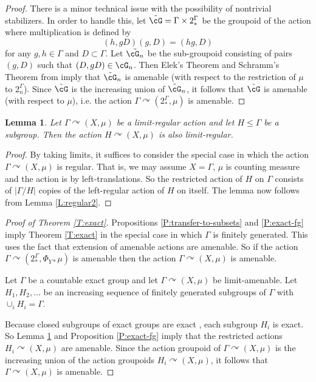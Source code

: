 \documentclass[12pt]{article}
\theoremstyle{plain}
\newtheorem{lem}[thm]{Lemma}
\theoremstyle{definition}
\theoremstyle{remark}
\newcommand{\G}{\Gamma}
\def\cc{{\curvearrowright}}
\begin{document}
\begin{proof}
There is a minor technical issue with the possibility of nontrivial stabilizers. In order to handle this, let $\tilde{\cG}=\G\times 2_*^\G$ be the groupoid of the action where multiplication is defined by 
$$(h,gD)(g,D)=(hg,D)$$
for any $g,h\in \G$ and $D \subset \G$. Let $\tilde{\cG_n}$ be the sub-groupoid consisting of pairs $(g,D)$ such that $(D,gD) \in \cG_n$. Then Elek's Theorem \cite{MR2967301} and Schramm's Theorem from \cite{MR2372897} imply that $\tilde{\cG}_n$ is amenable (with respect to the restriction of $\mu$ to $2^\G_n$). Since $\tilde{\cG}$ is the increasing union of $\tilde{\cG}_n$, it follows that $\tilde{\cG}$ is amenable (with respect to $\mu$), i.e. the action $\G \cc (2^\G_*,\mu)$ is amenable. 
\end{proof}

\begin{lem}\label{L:limits-subgroup}
    Let $\G \cc (X,\mu)$ be a limit-regular action and let $H \le \G$ be a subgroup. Then the action $H \cc (X,\mu)$ is also limit-regular.
\end{lem}

\begin{proof}
   By taking limits, it suffices to consider the special case in which the action $\G \cc (X,\mu)$ is regular. That is, we may assume $X=\G$, $\mu$ is counting measure and the action is by left-translations. So the restricted action of $H$ on $\G$ consists of $|\G/H|$ copies of the left-regular action of $H$ on itself. The lemma now follows from Lemma \ref{L:regular2}.
\end{proof}


\begin{proof}[Proof of Theorem \ref{T:exact}]
Propositions \ref{P:transfer-to-subsets} and \ref{P:exact-fg} imply Theorem \ref{T:exact} in the special case in which $\G$ is finitely generated. This uses the fact that extension of amenable actions are amenable. So if the action $\G \cc (2^\G_*, \Phi_{Y*}\mu)$ is amenable then the action $\G \cc (X,\mu)$ is amenable.


Let $\G$ be a countable exact group and let $\G \cc (X,\mu)$ be limit-amenable. Let $H_1,H_2,\ldots$ be an increasing sequence of finitely generated subgroups of $\G$ with $\cup_i H_i = \G$. 

Because closed subgroups of exact groups are exact \cite[Theorem 4.1]{MR1725812}, each subgroup $H_i$ is exact. So Lemma \ref{L:limits-subgroup} and Proposition \ref{P:exact-fg} imply that the restricted actions $H_i \cc (X,\mu)$ are amenable. Since the action groupoid of $\G \cc (X,\mu)$ is the increasing union of the action groupoids $H_i \cc (X,\mu)$, it follows that $\G \cc (X,\mu)$ is amenable. 
\end{proof}
\end{document}

